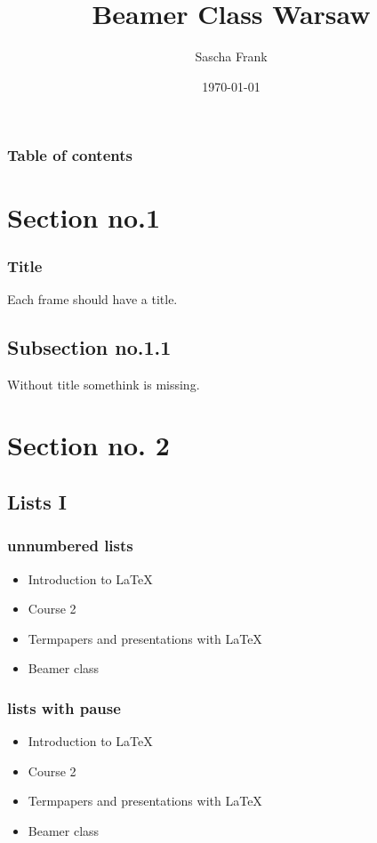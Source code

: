 \documentclass[handout]{beamer}
\begin{document}
\title{Beamer Class Warsaw}  
\author{Sascha Frank}
\date{\today} 

\begin{frame}
\titlepage
\end{frame} 

\begin{frame}
\frametitle{Table of contents}
\tableofcontents
\end{frame} 



\section{Section no.1} 
\begin{frame}\frametitle{Title} 
Each frame should have a title.
\end{frame}
\subsection{Subsection no.1.1  }
\begin{frame} 
Without title somethink is missing. 
\end{frame}


\section{Section no. 2} 
\subsection{Lists I}
\begin{frame}\frametitle{unnumbered lists}
\begin{itemize}
\item Introduction to  \LaTeX  
\item Course 2 
\item Termpapers and presentations with \LaTeX 
\item Beamer class
\end{itemize} 
\end{frame}

\begin{frame}\frametitle{lists with pause}
\begin{itemize}
\item Introduction to  \LaTeX \pause 
\item Course 2 \pause 
\item Termpapers and presentations with \LaTeX \pause 
\item Beamer class
\end{itemize} 
\end{frame}
\end{document}
